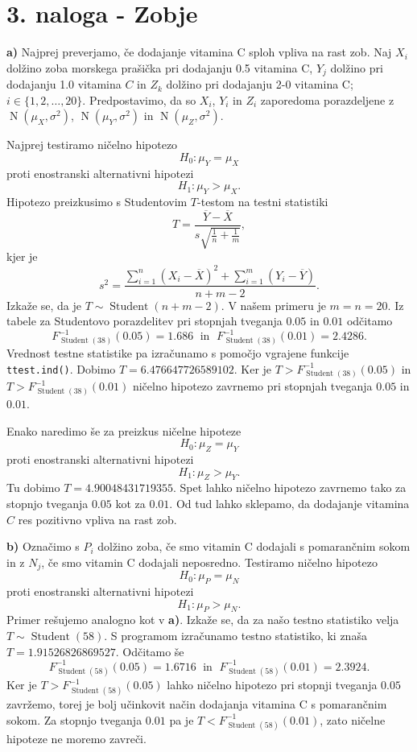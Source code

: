 \documentclass[a4paper,11pt]{article}
\DeclareMathOperator{\N}{N}
\begin{document}
\section*{3. naloga - Zobje}

\noindent
\textbf{a)} 
Najprej preverjamo, če dodajanje vitamina C sploh vpliva na rast zob. Naj $X_i$ dolžino zoba morskega prašička pri dodajanju 0.5 vitamina C, $Y_j$ dolžino pri dodajanju 1.0 vitamina $C$ in $Z_k$ dolžino pri dodajanju 2-0 vitamina C; $i\in\{1,2,\dots,20\}$. Predpostavimo, da so $X_i$, $Y_i$ in $Z_i$ zaporedoma porazdeljene z $\N(\mu_X,\sigma^2)$, $\N(\mu_Y,\sigma^2)$ in $\N(\mu_Z,\sigma^2)$.

Najprej testiramo ničelno hipotezo 
\[ 
    H_0: \mu_Y = \mu_X 
\] 
proti enostranski alternativni hipotezi 
\[ 
    H_1: \mu_Y >\mu_X.
\]
Hipotezo preizkusimo s Studentovim $T$-testom na testni statistiki
\[
    T = \frac{\overline{Y}-\overline{X}}{s\sqrt{\frac{1}{n}+\frac{1}{m}}},
\]
kjer je 
\[
    s^2 = \frac{\sum_{i=1}^n (X_i-\overline{X})^2+\sum_{i=1}^m(Y_i-\overline{Y})}{n+m-2}.
\]
Izkaže se, da je $T\sim\operatorname{Student}(n+m-2).$ V našem primeru je $m=n=20$. Iz tabele za Studentovo porazdelitev pri stopnjah tveganja $0.05$ in $0.01$ odčitamo 
\[
    F^{-1}_{\operatorname{Student}(38)}(0.05) = 1.686 \; \text{ in } \; F^{-1}_{\operatorname{Student}(38)}(0.01) = 2.4286.
\]
Vrednost testne statistike pa izračunamo s pomočjo vgrajene funkcije \texttt{ttest.ind()}. Dobimo $T = 6.476647726589102$. Ker je $T > F^{-1}_{\operatorname{Student}(38)}(0.05)$ in $T > F^{-1}_{\operatorname{Student}(38)}(0.01)$ ničelno hipotezo zavrnemo pri stopnjah tveganja $0.05$ in $0.01$.

Enako naredimo še za preizkus ničelne hipoteze
\[ 
    H_0: \mu_Z = \mu_Y
\] 
proti enostranski alternativni hipotezi 
\[ 
    H_1: \mu_Z >\mu_Y.
\]
Tu dobimo $T = 4.90048431719355$. Spet lahko ničelno hipotezo zavrnemo tako za stopnjo tveganja $0.05$ kot za $0.01$. Od tud lahko sklepamo, da dodajanje vitamina $C$ res pozitivno vpliva na rast zob.
\newline 

\noindent
\textbf{b)} Označimo s $P_i$ dolžino zoba, če smo vitamin C dodajali s pomarančnim sokom in z $N_j$, če smo vitamin C dodajali neposredno. Testiramo ničelno hipotezo 
\[ 
    H_0: \mu_P = \mu_N
\] 
proti enostranski alternativni hipotezi 
\[ 
    H_1: \mu_P >\mu_N.
\]
Primer rešujemo analogno kot v \textbf{a)}. Izkaže se, da za našo testno statistiko velja $T\sim\operatorname{Student}(58)$. S programom izračunamo testno statistiko, ki znaša $T=1.91526826869527$.  Odčitamo še 
\[
    F^{-1}_{\operatorname{Student}(58)}(0.05) = 1.6716 \; \text{ in } \; F^{-1}_{\operatorname{Student}(58)}(0.01) = 2.3924.
\]
Ker je $T > F^{-1}_{\operatorname{Student}(58)}(0.05)$ lahko ničelno hipotezo pri stopnji tveganja $0.05$ zavržemo, torej je bolj učinkovit način dodajanja vitamina C s pomarančnim sokom. Za stopnjo tveganja $0.01$ pa je $T < F^{-1}_{\operatorname{Student}(58)}(0.01)$, zato ničelne hipoteze ne moremo zavreči.
\end{document}
